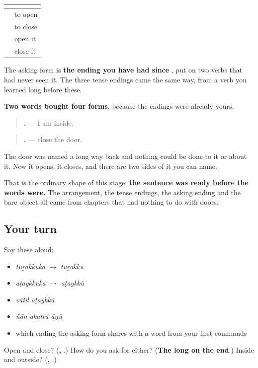 \begin{grammarlens}[title={Grammar Lens: four words, and none of them needed a new rule}]
\noindent
\begin{tabularx}{\linewidth}{@{}>{\raggedright\arraybackslash}X>{\raggedright\arraybackslash}X@{}}
\toprule
\textbf{} & \textbf{} \\
\midrule
\textbf{\ml{തുറക്കുക}} & to open \\
\textbf{\ml{അടയ്ക്കുക}} & to close \\
\textbf{\ml{തുറക്കൂ}} & open it \\
\textbf{\ml{അടയ്ക്കൂ}} & close it \\
\bottomrule
\end{tabularx}

The asking form is \textbf{the ending you have had since }, put on two verbs that had never seen it. The three tense endings came the same way, from a verb you learned long before these.

\textbf{Two words bought four forms}, because the endings were already yours.
\end{grammarlens}

\begin{grammarlens}[title={What you've built}]
\begin{quote}
\textbf{  .} — I am inside.
\end{quote}

\begin{quote}
\textbf{ .} — close the door.
\end{quote}

The door was named a long way back and nothing could be done to it or about it. Now it opens, it closes, and there are two sides of it you can name.

That is the ordinary shape of this stage: \textbf{the sentence was ready before the words were.} The arrangement, the tense endings, the asking ending and the bare object all came from chapters that had nothing to do with doors.
\end{grammarlens}

\subsection*{Your turn}
Say these aloud:

\begin{itemize}
\raggedright
  \item \emph{tuṟakkuka} $\to$ \emph{tuṟakkū}
  \item \emph{aṭaykkuka} $\to$ \emph{aṭaykkū}
  \item \emph{vātil aṭaykkū}
  \item \emph{ñān akattŭ āṇŭ}
  \item which ending the asking form shares with a word from your first commands
\end{itemize}

\begin{tcolorbox}[breakable,colback=teal!4,colframe=teal!35!black,title={Before you move on}]
Open and close? (\textbf{, }.) How do you ask for either? (\textbf{The long  on the end}.) Inside and outside? (\textbf{, }.)
\end{tcolorbox}
